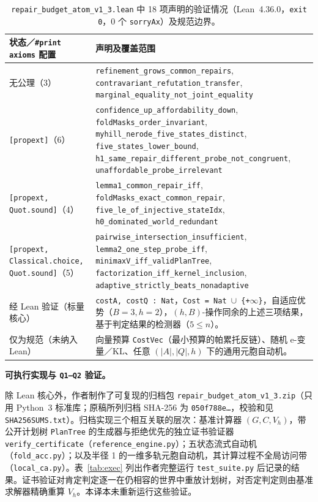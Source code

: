 \documentclass[11pt,a4paper]{article}
\theoremstyle{preprintthm}
\theoremstyle{preprintdef}
\newcommand{\subheading}[1]{\par\addvspace{8pt}\noindent\textbf{#1}\par\nobreak}
\begin{document}
\begin{table}[!htbp]
\centering
\caption{\texttt{repair\_budget\_atom\_v1\_3.lean} 中 18 项声明的验证情况（Lean~4.36.0，\texttt{exit 0}，0 个 \texttt{sorryAx}）及规范边界。}
\label{tab:lean}
\footnotesize
\begin{tabularx}{\linewidth}{@{}l >{\raggedright\arraybackslash}X@{}}
\toprule
\textbf{状态／\texttt{\#print axioms} 配置} & \textbf{声明及覆盖范围} \\
\midrule
无公理（3） & \texttt{refinement\_grows\_common\_repairs}, \texttt{contravariant\_refutation\_transfer}, \texttt{marginal\_equality\_not\_joint\_equality} \\
\texttt{[propext]}（6） & \texttt{confidence\_up\_affordability\_down}, \texttt{foldMasks\_order\_invariant}, \texttt{myhill\_nerode\_five\_states\_distinct}, \texttt{five\_states\_lower\_bound}, \texttt{h1\_\allowbreak same\_\allowbreak repair\_\allowbreak different\_\allowbreak probe\_\allowbreak not\_\allowbreak congruent}, \texttt{unaffordable\_probe\_irrelevant} \\
\texttt{[propext, Quot.sound]}（4） & \texttt{lemma1\_common\_repair\_iff}, \texttt{foldMasks\_exact\_common\_repair}, \texttt{five\_le\_of\_injective\_stateIdx}, \texttt{h0\_dominated\_world\_redundant} \\
\texttt{[propext, Classical.choice, Quot.sound]}（5） & \texttt{pairwise\_intersection\_insufficient}, \texttt{lemma2\_one\_step\_probe\_iff}, \texttt{minimaxV\_iff\_validPlanTree}, \texttt{factorization\_iff\_kernel\_inclusion}, \texttt{adaptive\_\allowbreak strictly\_\allowbreak beats\_\allowbreak nonadaptive} \\
\midrule
经 Lean 验证（标量核心） & \texttt{costA, costQ : Nat}，\texttt{Cost = Nat $\cup$ \{+$\infty$\}}，自适应优势（$B=3,h=2$），$(h,B)$-操作同余的上述三项结果，基于判定结果的检测器（$5\le n$）。 \\
仅为规范（未纳入 Lean） & 向量预算 \texttt{CostVec}（最小预算的帕累托反链）、随机 e-变量／KL、任意 $(|A|,|Q|,h)$ 下的通用元胞自动机。 \\
\bottomrule
\end{tabularx}
\end{table}

\subheading{可执行实现与 \texttt{Q1--Q2} 验证。}
除 Lean 核心外，作者制作了可复现的归档包 \texttt{repair\_budget\_atom\_v1\_3.zip}（只用 Python~3 标准库；原稿所列归档 SHA-256 为 \texttt{050f788e\ldots}，校验和见 \texttt{SHA256SUMS.txt}）。归档实现三个相互关联的层次：基准计算器 $(G,C,V_h)$，带公开计划树 \texttt{PlanTree} 的生成器与拒绝优先的独立证书验证器 \texttt{verify\_certificate}（\texttt{reference\_engine.py}）；五状态流式自动机（\texttt{fold\_acc.py}）；以及半径 1 的一维多轨元胞自动机，其计算过程不全局访问带（\texttt{local\_ca.py}）。表~\ref{tab:exec} 列出作者完整运行 \texttt{test\_suite.py} 后记录的结果。证书验证对肯定判定逐一在仍相容的世界中重放计划树，对否定判定则由基准求解器精确重算 $V_h$。本译本未重新运行这些验证。
\end{document}
